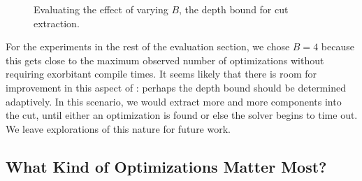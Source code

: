 \begin{figure}[tbp]
  \centering
  \hfill
  \hfill
  \caption{Evaluating the effect of varying $B$, the depth bound for
    cut extraction.}
  \label{fig:loop}
\end{figure}


For the experiments in the rest of the evaluation section, we chose
$B=4$ because this gets close to the maximum observed number of
optimizations without requiring exorbitant compile times.
%
It seems likely that there is room for improvement in this aspect of
\minotaur: perhaps the depth bound should be determined adaptively.
%
In this scenario, we would extract more and more components into the
cut, until either an optimization is found or else the solver begins
to time out.
%
We leave explorations of this nature for future work.


\subsection{What Kind of Optimizations Matter Most?}

